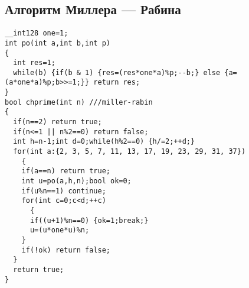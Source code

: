 \subsection{Алгоритм Миллера --- Рабина}
\begin{lstlisting}
__int128 one=1;
int po(int a,int b,int p)
{
  int res=1;
  while(b) {if(b & 1) {res=(res*one*a)%p;--b;} else {a=(a*one*a)%p;b>>=1;}} return res;
}
bool chprime(int n) ///miller-rabin
{
  if(n==2) return true;
  if(n<=1 || n%2==0) return false;
  int h=n-1;int d=0;while(h%2==0) {h/=2;++d;}
  for(int a:{2, 3, 5, 7, 11, 13, 17, 19, 23, 29, 31, 37})
    {
    if(a==n) return true;
    int u=po(a,h,n);bool ok=0;
    if(u%n==1) continue;
    for(int c=0;c<d;++c)
      {
      if((u+1)%n==0) {ok=1;break;}
      u=(u*one*u)%n;
    }
    if(!ok) return false;
  }
  return true;
}
\end{lstlisting}